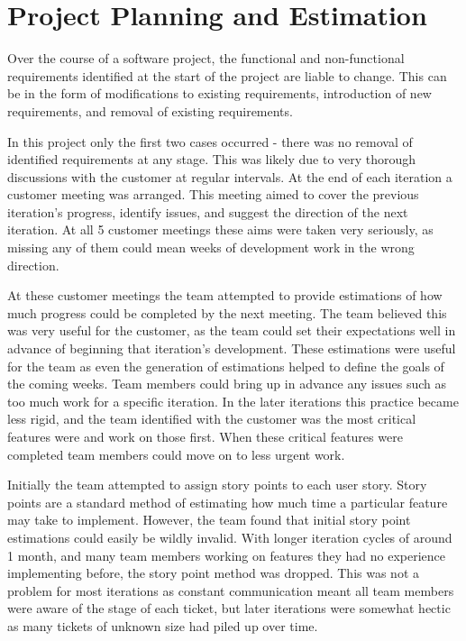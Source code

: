 \documentclass{l3proj}
\begin{document}

\section{Project Planning and Estimation}
\label{sec:planning}

Over the course of a software project, the functional and non-functional requirements identified at the start of the project are liable to change. This can be in the form of modifications to existing requirements, introduction of new requirements, and removal of existing requirements.

In this project only the first two cases occurred - there was no removal of identified requirements at any stage. This was likely due to very thorough discussions with the customer at regular intervals. At the end of each iteration a customer meeting was arranged. This meeting aimed to cover the previous iteration's progress, identify issues, and suggest the direction of the next iteration. At all 5 customer meetings these aims were taken very seriously, as missing any of them could mean weeks of development work in the wrong direction.

At these customer meetings the team attempted to provide estimations of how much progress could be completed by the next meeting. The team believed this was very useful for the customer, as the team could set their expectations well in advance of beginning that iteration's development. These estimations were useful for the team as even the generation of estimations helped to define the goals of the coming weeks. Team members could bring up in advance any issues such as too much work for a specific iteration. In the later iterations this practice became less rigid, and the team identified with the customer was the most critical features were and work on those first. When these critical features were completed team members could move on to less urgent work.

Initially the team attempted to assign story points to each user story. Story points are a standard method of estimating how much time a particular feature may take to implement. However, the team found that initial story point estimations could easily be wildly invalid. With longer iteration cycles of around 1 month, and many team members working on features they had no experience implementing before, the story point method was dropped. This was not a problem for most iterations as constant communication meant all team members were aware of the stage of each ticket, but later iterations were somewhat hectic as many tickets of unknown size had piled up over time.
\end{document}
